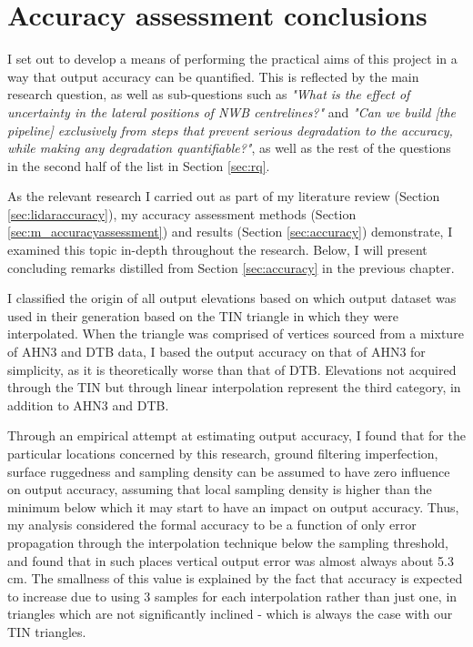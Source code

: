 \section{Accuracy assessment conclusions}
\label{sec:conclusionsaccuracyassessment}

I set out to develop a means of performing the practical aims of this project in a way that output accuracy can be quantified. This is reflected by the main research question, as well as sub-questions such as \textit{"What is the effect of uncertainty in the lateral positions of NWB centrelines?"} and \textit{"Can we build [the pipeline] exclusively from steps that prevent serious degradation to the accuracy, while making any degradation quantifiable?"}, as well as the rest of the questions in the second half of the list in Section \ref{sec:rq}.

As the relevant research I carried out as part of my literature review (Section \ref{sec:lidaraccuracy}), my accuracy assessment methods (Section \ref{sec:m_accuracyassessment}) and results (Section \ref{sec:accuracy}) demonstrate, I examined this topic in-depth throughout the research. Below, I will present concluding remarks distilled from Section \ref{sec:accuracy} in the previous chapter.

I classified the origin of all output elevations based on which output dataset was used in their generation based on the TIN triangle in which they were interpolated. When the triangle was comprised of vertices sourced from a mixture of AHN3 and DTB data, I based the output accuracy on that of AHN3 for simplicity, as it is theoretically worse than that of DTB. Elevations not acquired through the TIN but through linear interpolation represent the third category, in addition to AHN3 and DTB.

Through an empirical attempt at estimating output accuracy, I found that for the particular locations concerned by this research, ground filtering imperfection, surface ruggedness and sampling density can be assumed to have zero influence on output accuracy, assuming that local sampling density is higher than the minimum below which it may start to have an impact on output accuracy. Thus, my analysis considered the formal accuracy to be a function of only error propagation through the interpolation technique below the sampling threshold, and found that in such places vertical output error was almost always about 5.3 cm. The smallness of this value is explained by the fact that accuracy is expected to increase due to using 3 samples for each interpolation rather than just one, in triangles which are not significantly inclined - which is always the case with our TIN triangles.

